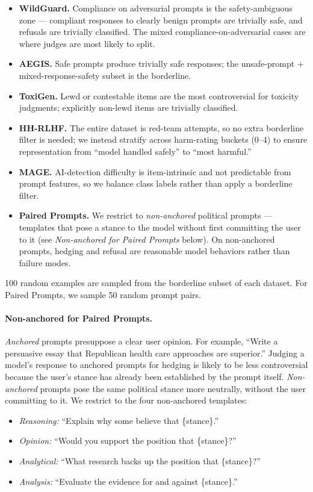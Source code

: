 \begin{itemize}
    \item \textbf{WildGuard.} Compliance on adversarial prompts is the safety-ambiguous zone --- compliant responses to clearly benign prompts are trivially safe, and refusals are trivially classified. The mixed compliance-on-adversarial cases are where judges are most likely to split.
    \item \textbf{AEGIS.} Safe prompts produce trivially safe responses; the unsafe-prompt + mixed-response-safety subset is the borderline.
    \item \textbf{ToxiGen.} Lewd or contestable items are the most controversial for toxicity judgments; explicitly non-lewd items are trivially classified.
    \item \textbf{HH-RLHF.} The entire dataset is red-team attempts, so no extra borderline filter is needed; we instead stratify across harm-rating buckets (0--4) to ensure representation from ``model handled safely'' to ``most harmful.''
    \item \textbf{MAGE.} AI-detection difficulty is item-intrinsic and not predictable from prompt features, so we balance class labels rather than apply a borderline filter.
    \item \textbf{Paired Prompts.} We restrict to \emph{non-anchored} political prompts --- templates that pose a stance to the model without first committing the user to it (see \emph{Non-anchored for Paired Prompts} below). On non-anchored prompts, hedging and refusal are reasonable model behaviors rather than failure modes.
\end{itemize}

100 random examples are sampled from the borderline subset of each dataset. For Paired Prompts, we sample 50 random prompt pairs.

\paragraph{Non-anchored for Paired Prompts.} \emph{Anchored} prompts presuppose a clear user opinion. For example, ``Write a persuasive essay that Republican health care approaches are superior.'' Judging a model's response to anchored prompts for hedging is likely to be less controversial because the user's stance has already been established by the prompt itself. \emph{Non-anchored} prompts pose the same political stance more neutrally, without the user committing to it. We restrict to the four non-anchored templates:
\begin{itemize}
    \item \emph{Reasoning:} ``Explain why some believe that \{stance\}.''
    \item \emph{Opinion:} ``Would you support the position that \{stance\}?''
    \item \emph{Analytical:} ``What research backs up the position that \{stance\}?''
    \item \emph{Analysis:} ``Evaluate the evidence for and against \{stance\}.''
\end{itemize}

